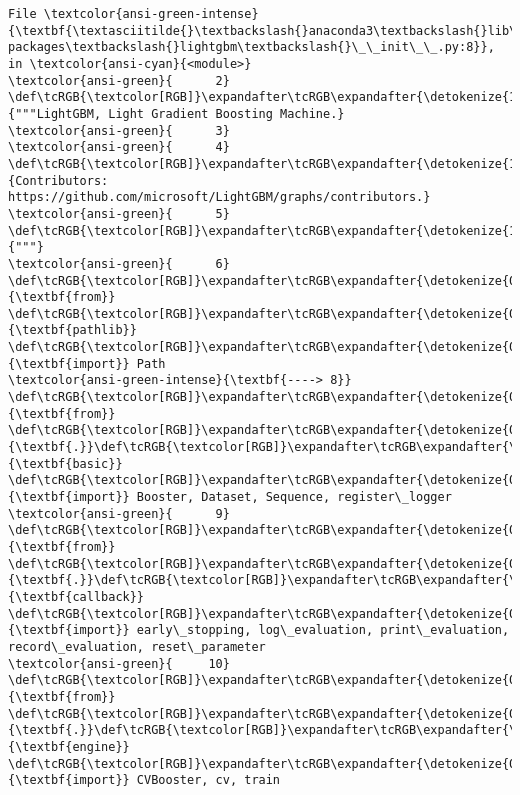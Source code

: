 \documentclass[11pt]{article}
\begin{document}
\begin{Verbatim}[commandchars=\\\{\}, frame=single, framerule=2mm, rulecolor=\color{outerrorbackground}]
File \textcolor{ansi-green-intense}{\textbf{\textasciitilde{}\textbackslash{}anaconda3\textbackslash{}lib\textbackslash{}site-packages\textbackslash{}lightgbm\textbackslash{}\_\_init\_\_.py:8}}, in \textcolor{ansi-cyan}{<module>}
\textcolor{ansi-green}{      2} \def\tcRGB{\textcolor[RGB]}\expandafter\tcRGB\expandafter{\detokenize{175,0,0}}{"""LightGBM, Light Gradient Boosting Machine.}
\textcolor{ansi-green}{      3} 
\textcolor{ansi-green}{      4} \def\tcRGB{\textcolor[RGB]}\expandafter\tcRGB\expandafter{\detokenize{175,0,0}}{Contributors: https://github.com/microsoft/LightGBM/graphs/contributors.}
\textcolor{ansi-green}{      5} \def\tcRGB{\textcolor[RGB]}\expandafter\tcRGB\expandafter{\detokenize{175,0,0}}{"""}
\textcolor{ansi-green}{      6} \def\tcRGB{\textcolor[RGB]}\expandafter\tcRGB\expandafter{\detokenize{0,135,0}}{\textbf{from}} \def\tcRGB{\textcolor[RGB]}\expandafter\tcRGB\expandafter{\detokenize{0,0,255}}{\textbf{pathlib}} \def\tcRGB{\textcolor[RGB]}\expandafter\tcRGB\expandafter{\detokenize{0,135,0}}{\textbf{import}} Path
\textcolor{ansi-green-intense}{\textbf{----> 8}} \def\tcRGB{\textcolor[RGB]}\expandafter\tcRGB\expandafter{\detokenize{0,135,0}}{\textbf{from}} \def\tcRGB{\textcolor[RGB]}\expandafter\tcRGB\expandafter{\detokenize{0,0,255}}{\textbf{.}}\def\tcRGB{\textcolor[RGB]}\expandafter\tcRGB\expandafter{\detokenize{0,0,255}}{\textbf{basic}} \def\tcRGB{\textcolor[RGB]}\expandafter\tcRGB\expandafter{\detokenize{0,135,0}}{\textbf{import}} Booster, Dataset, Sequence, register\_logger
\textcolor{ansi-green}{      9} \def\tcRGB{\textcolor[RGB]}\expandafter\tcRGB\expandafter{\detokenize{0,135,0}}{\textbf{from}} \def\tcRGB{\textcolor[RGB]}\expandafter\tcRGB\expandafter{\detokenize{0,0,255}}{\textbf{.}}\def\tcRGB{\textcolor[RGB]}\expandafter\tcRGB\expandafter{\detokenize{0,0,255}}{\textbf{callback}} \def\tcRGB{\textcolor[RGB]}\expandafter\tcRGB\expandafter{\detokenize{0,135,0}}{\textbf{import}} early\_stopping, log\_evaluation, print\_evaluation, record\_evaluation, reset\_parameter
\textcolor{ansi-green}{     10} \def\tcRGB{\textcolor[RGB]}\expandafter\tcRGB\expandafter{\detokenize{0,135,0}}{\textbf{from}} \def\tcRGB{\textcolor[RGB]}\expandafter\tcRGB\expandafter{\detokenize{0,0,255}}{\textbf{.}}\def\tcRGB{\textcolor[RGB]}\expandafter\tcRGB\expandafter{\detokenize{0,0,255}}{\textbf{engine}} \def\tcRGB{\textcolor[RGB]}\expandafter\tcRGB\expandafter{\detokenize{0,135,0}}{\textbf{import}} CVBooster, cv, train


\end{Verbatim}
\end{document}
